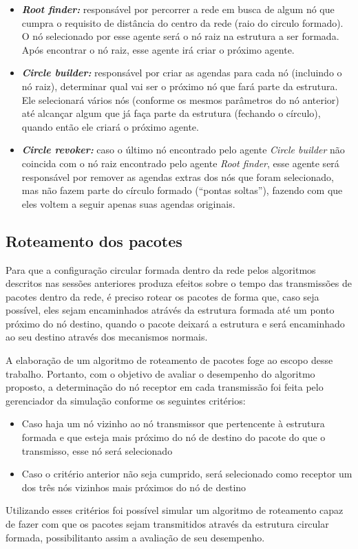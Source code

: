 \begin{itemize}
 \item \textbf{\emph{Root finder:}} responsável por percorrer a rede em busca de algum nó que cumpra o requisito de distância do centro da rede (raio do circulo formado). O nó selecionado por esse agente será o nó raiz na estrutura a ser formada. Após encontrar o nó raiz, esse agente irá criar o próximo agente. 
 \item \textbf{\emph{Circle builder:}} responsável por criar as agendas para cada nó (incluindo o nó raiz), determinar qual vai ser o próximo nó que fará parte da estrutura. Ele selecionará vários nós (conforme os mesmos parâmetros do nó anterior) até alcançar algum que já faça parte da estrutura (fechando o círculo), quando então ele criará o próximo agente.
 \item \textbf{\emph{Circle revoker:}} caso o último nó encontrado pelo agente \emph{Circle builder} não coincida com o nó raiz encontrado pelo agente \emph{Root finder}, esse agente será responsável por remover as agendas extras dos nós que foram selecionado, mas não fazem parte do círculo formado (``pontas soltas''), fazendo com que eles voltem a seguir apenas suas agendas originais.
\end{itemize}

\subsection{Roteamento dos pacotes}

Para que a configuração circular formada dentro da rede pelos algoritmos descritos nas sessões anteriores produza efeitos sobre o tempo das transmissões de pacotes dentro da rede, é preciso rotear os pacotes de forma que, caso seja possível, eles sejam encaminhados atrávés da estrutura formada até um ponto próximo do nó destino, quando o pacote deixará a estrutura e será encaminhado ao seu destino através dos mecanismos normais. 

A elaboração de um algoritmo de roteamento de pacotes foge ao escopo desse trabalho. Portanto, com o objetivo de avaliar o desempenho do algoritmo proposto, a determinação do nó receptor em cada transmissão foi feita pelo gerenciador da simulação conforme os seguintes critérios:

\begin{itemize}
\item Caso haja um nó vizinho ao nó transmissor que pertencente à estrutura formada e que esteja mais próximo do nó de destino do pacote do que o transmisso, esse nó será selecionado
\item Caso o critério anterior não seja cumprido, será selecionado como receptor um dos três nós vizinhos mais próximos do nó de destino
\end{itemize}

Utilizando esses critérios foi possível simular um algoritmo de roteamento capaz de fazer com que os pacotes sejam transmitidos através da estrutura circular formada, possibilitanto assim a avaliação de seu desempenho.



